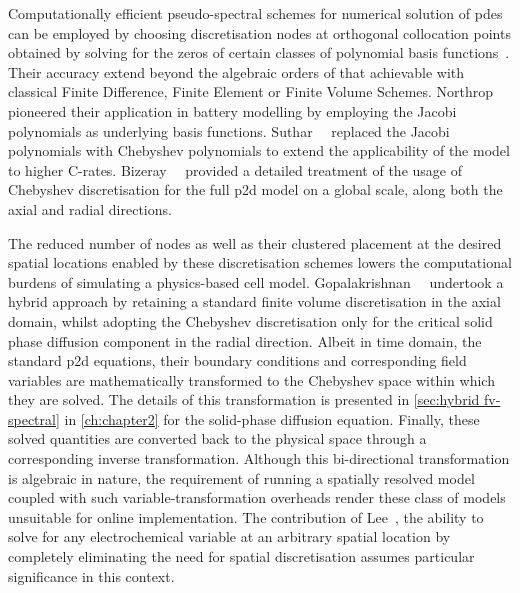 Computationally    efficient     pseudo-spectral    schemes     for    numerical
solution   of   \gls{pde}s   can be employed    by   choosing   discretisation
nodes    at    orthogonal    collocation     points    obtained    by    solving
for     the    zeros     of    certain     classes    of     polynomial    basis
functions~\cite{Ferguson1971,Trefethen2000,Boyd2001,Shizgal2015,Dutykh2016}.
Their accuracy extend beyond  the  algebraic  orders of that achievable with
classical  Finite  Difference,  Finite Element  or Finite Volume Schemes.
Northrop~\etal{}~\cite{Northrop2011} pioneered their application in battery
modelling by employing the Jacobi polynomials as underlying basis functions.
Suthar~\etal{}~\cite{Suthar2014} replaced the Jacobi polynomials with Chebyshev
polynomials to extend the applicability of the model to higher C-rates.
Bizeray~\etal{}~\cite{Bizeray2015}    provided   a detailed treatment of the
usage of Chebyshev discretisation  for   the  full   \gls{p2d} model   on  a
global  scale,  \ie{}  along  both   the  axial  and  radial directions.


The  reduced  number of  nodes  as  well as  their  clustered  placement at  the
desired  spatial  locations  enabled  by  these  discretisation  schemes  lowers
the   computational  burdens   of   simulating  a   physics-based  cell   model.
Gopalakrishnan~\etal{}~\cite{Gopalakrishnan2018} undertook a  hybrid approach by
retaining a  standard finite volume  discretisation in the axial  domain, whilst
adopting  the  Chebyshev  discretisation  only  for  the  critical  solid  phase
diffusion component in the radial direction. Albeit in time domain, the standard
\gls{p2d} equations, their boundary conditions and corresponding field variables
are  mathematically transformed  to the  Chebyshev space  within which  they are
solved.  The details  of this  transformation is  presented in  \cref{sec:hybrid
fv-spectral}  in  \cref{ch:chapter2}  for the  solid-phase  diffusion  equation.
Finally,  these solved  quantities  are  converted back  to  the physical  space
through  a corresponding  inverse transformation.  Although this  bi-directional
transformation is  algebraic in nature,  the requirement of running  a spatially
resolved model coupled with  such variable-transformation overheads render these
class  of  models unsuitable  for  online  implementation. The  contribution  of
Lee~\etal{}, \ie{} the  ability to solve for any electrochemical  variable at an
arbitrary  spatial  location by  completely  eliminating  the need  for  spatial
discretisation assumes particular significance in this context.



